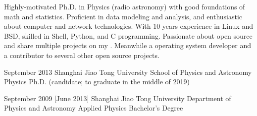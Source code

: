\documentclass{resume}
\begin{document}
\makeheader

Highly-motivated Ph.D. in Physics (radio astronomy)
with good foundations of math and statistics.
Proficient in data modeling and analysis,
and enthusiastic about computer and network technologies.
With 10 years experience in Linux and BSD,
skilled in Shell, Python, and C programming.
Passionate about open source and share multiple projects on my
.
Meanwhile a 
operating system developer and a contributor to several other
open source projects.

\begin{competences}[10em]
\end{competences}

\begin{educations}
  \education%
    {September 2013}%
    {Shanghai Jiao Tong University}%
    {School of Physics and Astronomy}%
    {Physics}%
    {Ph.D. (candidate; to graduate in the middle of 2019)}

  \separator{0.5ex}
  \education%
    {September 2009}%
    [June 2013]%
    {Shanghai Jiao Tong University}%
    {Department of Physics and Astronomy}%
    {Applied Physics}%
    {Bachelor's Degree}
\end{educations}
\end{document}
